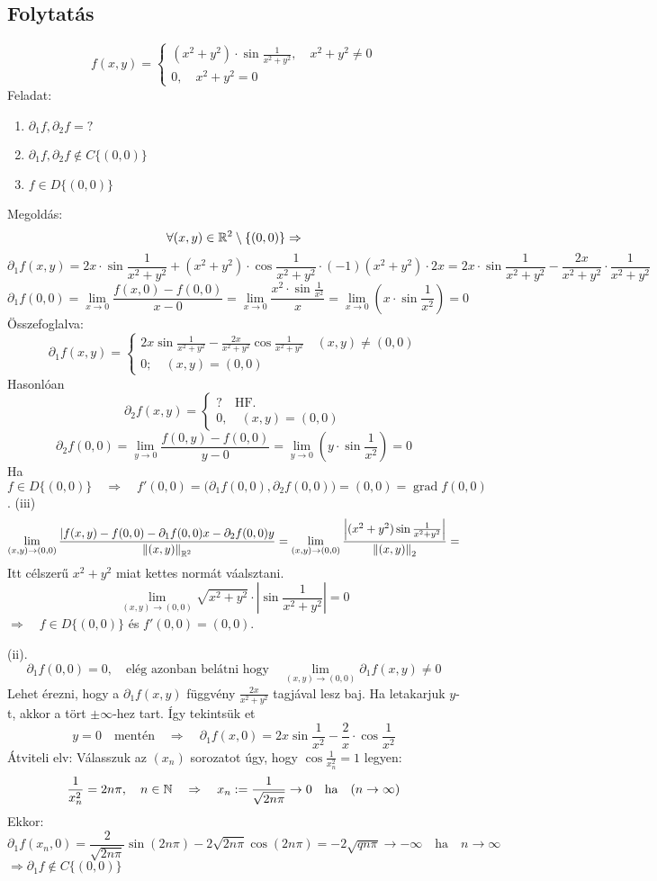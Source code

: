 \documentclass[a4paper,11.5pt]{article}
\DeclareMathOperator{\grad}{grad}
\newcommand{\norm}[1]{\left\lVert#1\right\rVert}
\begin{document}
	\subsection{Folytatás}
	\begin{task}
		\[ f(x,y)=\begin{cases}
			(x^2+y^2)\cdot\sin\frac{1}{x^2+y^2},\quad x^2+y^2\not=0\\
			0,\quad x^2+y^2=0
		\end{cases} \]
		Feladat:
		\begin{enumerate}
			\item $\partial_1f, \partial_2f=?$
			\item $\partial_1f, \partial_2f\notin C\{(0,0)\}$
			\item $f\in D\{(0,0)\}$
		\end{enumerate}
		Megoldás: 
		\[ \forall(x,y)\in\mathbb{R}^2\setminus\{(0,0)\}\Rightarrow \]
		\[ \partial_1f(x,y)=2x\cdot\sin\frac{1}{x^2+y^2}+(x^2+y^2)\cdot\cos\frac{1}{x^2+y^2}\cdot(-1)(x^2+y^2)\cdot2x=2x\cdot\sin\frac{1}{x^2+y^2}-\frac{2x}{x^2+y^2}\cdot\frac{1}{x^2+y^2} \]
		\[ \partial_1f(0,0)=\lim_{x\to0}\frac{f(x,0)-f(0,0)}{x-0}=\lim_{x\to0}\frac{x^2\cdot\sin\frac{1}{x^2}}{x}=\lim_{x\to0}(x\cdot\sin\frac{1}{x^2})=0 \]
		Összefoglalva:
		\[ \partial_1f(x,y)=\begin{cases}
			2x\sin\frac{1}{x^2+y^2}-\frac{2x}{x^2+y^2}\cos\frac{1}{x^2+y^2}\quad (x,y)\not=(0,0)\\
			0;\quad (x,y)=(0,0)
		\end{cases} \]
		Hasonlóan
		\[ \partial_2f(x,y)=\begin{cases}
			?\quad \text{HF.}\\
			0,\quad (x,y)=(0,0)
		\end{cases} \]
		\[ \partial_2f(0,0)=\lim_{y\to0}\frac{f(0,y)-f(0,0)}{y-0}=\lim_{y\to0}(y\cdot\sin\frac{1}{x^2})=0 \]
		Ha $f\in D\{(0,0)\}\quad \Rightarrow\quad f'(0,0)=\big(\partial_1f(0,0),\partial_2f(0,0)\big) =(0,0)=\grad f(0,0)$.
		(iii)
		\[ \lim_{(x,y)\to(0,0)}\frac{|f(x,y)-f(0,0)-\partial_1f(0,0)x-\partial_2f(0,0)y}{\norm{(x,y)}_{\R^2} }=\lim_{(x,y)\to(0,0)}\frac{\left|(x^2+y^2)\sin\frac{1}{x^2+y^2}\right|}{\norm{(x,y)}_{2}}= \]
		Itt célszerű $x^2+y^2$ miat kettes normát váalsztani.
		\[ \lim_{(x,y)\to(0,0)}\sqrt{x^2+y^2}\cdot\left|\sin\frac{1}{x^2+y^2}\right|=0 \]
		$\Rightarrow\quad f\in D\{(0,0)\}$ és $f'(0,0)=(0,0)$.
		
		(ii). 
		\[ \partial_1f(0,0)=0,\quad \text{elég azonban belátni hogy}\quad \lim_{(x,y)\to(0,0)}\partial_1f(x,y)\not=0 \]
		Lehet érezni, hogy a $\partial_1f(x,y)$ függvény $\frac{2x}{x^2+y^2}$ tagjával lesz baj. Ha letakarjuk $y$-t, akkor a tört $\pm\infty$-hez tart. Így tekintsük et
		\[ y=0\quad \text{mentén}\quad \Rightarrow\quad \partial_1f(x,0)=2x\sin\frac{1}{x^2}-\frac{2}{x}\cdot\cos\frac{1}{x^2} \]
		Átviteli elv: Válasszuk az $(x_n)$ sorozatot úgy, hogy $\cos\frac{1}{x^2_n}=1$ legyen:
		\[ \frac{1}{x^2_n}=2n\pi,\quad n\in\mathbb{N}\quad \Rightarrow\quad x_n:=\frac{1}{\sqrt{2n\pi}}\to0\quad \text{ha}\quad (n\to\infty) \]
		Ekkor:
		\[ \partial_1f(x_n,0)=\frac{2}{\sqrt{2n\pi}}\sin(2n\pi)-2\sqrt{2n\pi}\cos(2n\pi)=-2\sqrt{qn\pi}\to-\infty\quad \text{ha}\quad n\to\infty \]
		$\Rightarrow \partial_1f\notin C\{(0,0)\}$
	\end{task}
\end{document}
